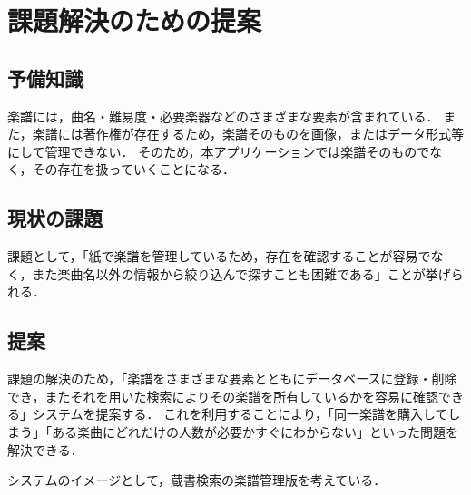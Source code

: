 \chapter{課題解決のための提案}\label{chap:課題解決のための提案}
\section{予備知識}
楽譜には，曲名・難易度・必要楽器などのさまざまな要素が含まれている．
また，楽譜には著作権が存在するため，楽譜そのものを画像，またはデータ形式等にして管理できない．
そのため，本アプリケーションでは楽譜そのものでなく，その存在を扱っていくことになる．
\section{現状の課題}
課題として，「紙で楽譜を管理しているため，存在を確認することが容易でなく，また楽曲名以外の情報から絞り込んで探すことも困難である」ことが挙げられる．
\section{提案}
課題の解決のため，「楽譜をさまざまな要素とともにデータベースに登録・削除でき，またそれを用いた検索によりその楽譜を所有しているかを容易に確認できる」システムを提案する．
これを利用することにより，「同一楽譜を購入してしまう」「ある楽曲にどれだけの人数が必要かすぐにわからない」といった問題を解決できる．\par
システムのイメージとして，蔵書検索の楽譜管理版を考えている．